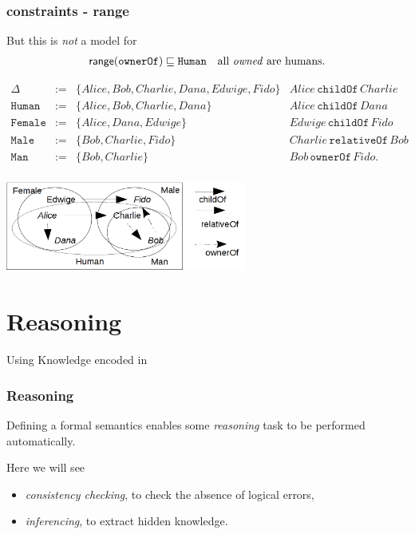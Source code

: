 \documentclass[8pt]{beamer}
\newcommand{\Human}{\mathtt{Human}}
\newcommand{\Male}{\mathtt{Male}}
\newcommand{\Female}{\mathtt{Female}}
\newcommand{\Man}{\mathtt{Man}}
\newcommand{\relative}{\mathtt{relativeOf}}
\newcommand{\child}{\mathtt{childOf}}
\newcommand{\owner}{\mathtt{ownerOf}}
\newcommand{\Alice}{Alice}
\newcommand{\Bob}{Bob}
\newcommand{\Charlie}{Charlie}
\newcommand{\Dana}{Dana}
\newcommand{\Edwige}{Edwige}
\newcommand{\Fido}{Fido}
\begin{document}
\begin{frame}
 \frametitle{\elplusplus constraints - range}
 But this is \emph{not} a model for 
 \[
 \begin{array}{cr}
    \range(\owner) \Issub \Human & \mbox{all \emph{owned} are humans.}
 \end{array}
 \]

 \[
 \begin{array}{rcl|l}
  \Delta & := & \{ \Alice, \Bob, \Charlie, \Dana, \Edwige, \Fido \} & \Alice\,\child\,\Charlie \\
  \Human & := & \{ \Alice, \Bob, \Charlie, \Dana \} & \Alice\,\child\,\Dana\\
  \Female & := & \{ \Alice, \Dana, \Edwige \} & \Edwige\,\child\,\Fido\\
  \Male & := & \{ \Bob, \Charlie, \Fido \} & \Charlie\,\relative\,\Bob \\
  \Man & := & \{ \Bob, \Charlie \} & \Bob\,\owner\,\Fido . \\
 \end{array}
\]

 \begin{center}
  \includegraphics[width=300px, keepaspectratio]{images/exbaseman_big.png}  
 \end{center}
\end{frame}

\section{Reasoning}

\begin{frame}
\Large{Using Knowledge encoded in \elplusplus} 
\end{frame}


\begin{frame}
 \frametitle{Reasoning}
 Defining a formal semantics enables some \emph{reasoning} task to be
 performed automatically.

 Here we will see
 \begin{itemize}
  \item \emph{consistency checking}, to check the absence of logical errors,
  \item \emph{inferencing}, to extract hidden knowledge.
 \end{itemize}
\end{frame}
\end{document}
